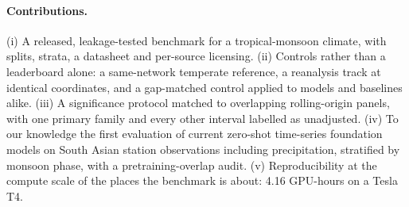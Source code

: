 \paragraph{Contributions.} (i) A released, leakage-tested benchmark for a tropical-monsoon climate, with splits,
strata, a datasheet and per-source licensing. (ii) Controls rather than a leaderboard alone: a same-network
temperate reference, a reanalysis track at identical coordinates, and a gap-matched control applied to models and
baselines alike. (iii) A significance protocol matched to overlapping rolling-origin panels, with one primary
family and every other interval labelled as unadjusted.
(iv) To our knowledge the first evaluation of current zero-shot time-series foundation models on South Asian
station observations including precipitation, stratified by monsoon phase, with a pretraining-overlap audit.
(v) Reproducibility at the compute scale of the places the benchmark is about: 4.16 GPU-hours on a Tesla T4.
